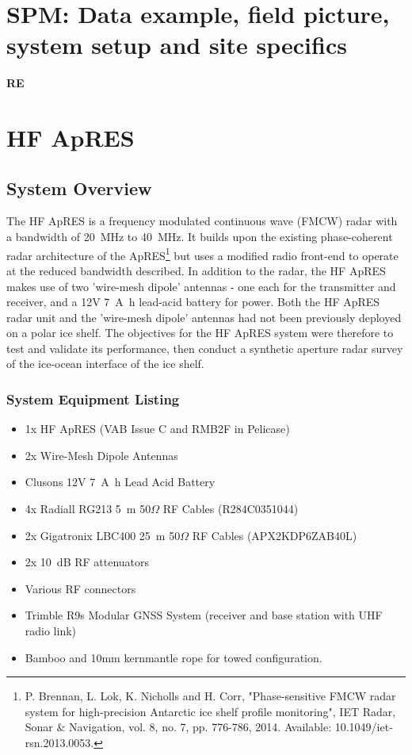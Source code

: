 \documentclass[a4paper,12pt]{article}
\begin{document}
\pagebreak
\section{SPM: Data example, field picture, system setup and site specifics}
\textbf{RE}
\label{SecSPM}

\pagebreak
\section{HF ApRES}
\label{SecHFApRES}

\subsection{System Overview}
The HF ApRES is a frequency modulated continuous wave (FMCW) radar with 
a bandwidth of \SI{20}{\mega\hertz} to \SI{40}{\mega\hertz}.  It builds
upon the existing phase-coherent radar architecture of the ApRES\footnote{
  P. Brennan, L. Lok, K. Nicholls and H. Corr, "Phase‐sensitive FMCW radar 
  system for high‐precision Antarctic ice shelf profile monitoring", IET 
  Radar, Sonar \& Navigation, vol. 8, no. 7, pp. 776-786, 2014. Available: 
  10.1049/iet-rsn.2013.0053.
} but uses a modified radio front-end to operate at the reduced bandwidth
described.  In addition to the radar, the HF ApRES makes use of two 'wire-mesh
dipole' antennas - one each for the transmitter and receiver, and a 12V 
\SI{7}{\ampere\hour} lead-acid battery for power.  Both the HF ApRES radar unit 
and  the 'wire-mesh dipole' antennas had not been previously deployed on a 
polar ice shelf.  The objectives for the HF ApRES system were therefore to test
and validate its performance, then conduct a synthetic aperture radar survey of
the ice-ocean interface of the ice shelf.

\subsubsection{System Equipment Listing}
\begin{itemize}
  \item 1x HF ApRES (VAB Issue C and RMB2F in Pelicase)
  \item 2x Wire-Mesh Dipole Antennas
  \item Clusons 12V \SI{7}{\ampere\hour} Lead Acid Battery
  \item 4x Radiall RG213 \SI{5}{\metre} 50$\Omega$ RF Cables (R284C0351044)
  \item 2x Gigatronix LBC400 \SI{25}{\metre} 50$\Omega$ RF Cables (APX2KDP6ZAB40L)
  \item 2x \SI{10}{\deci\bel} RF attenuators
  \item Various RF connectors
  \item Trimble R9s Modular GNSS System (receiver and base station with UHF
  radio link)
  \item Bamboo and 10mm kernmantle rope for towed configuration.
\end{itemize}
\end{document}
